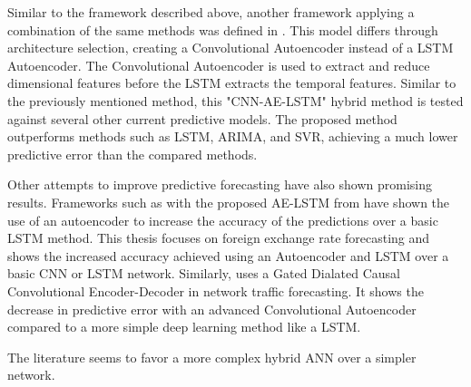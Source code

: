 Similar to the framework described above, another framework applying a combination of the same methods was defined in \cite{Zhao2019}.
This model differs through architecture selection, creating a Convolutional Autoencoder instead of a LSTM Autoencoder.
The Convolutional Autoencoder is used to extract and reduce dimensional features before the LSTM extracts the temporal features.
Similar to the previously mentioned method, this "CNN-AE-LSTM" hybrid method is tested against several other current predictive models.
The proposed method outperforms methods such as LSTM, ARIMA, and SVR, achieving a much lower predictive error than the compared methods.


Other attempts to improve predictive forecasting have also shown promising results.
Frameworks such as with the proposed AE-LSTM from \cite{VanHoa2021} have shown the use of an autoencoder to increase the accuracy of the predictions over a basic LSTM method.
This thesis focuses on foreign exchange rate forecasting and shows the increased accuracy achieved using an Autoencoder and LSTM over a basic CNN or LSTM network.
Similarly, \cite{Zhang2020} uses a Gated Dialated Causal Convolutional Encoder-Decoder in network traffic forecasting.
It shows the decrease in predictive error with an advanced Convolutional Autoencoder compared to a more simple deep learning method like a LSTM.

The literature seems to favor a more complex hybrid ANN over a simpler network.




\iffalse
  The proposed problem-space has data with high fluctuations and noise.
  In order to increase the predictive abilities of a model, a method well suited for working with data with high noise should be selected.
  A CNN-AE model should be able to solve this problem.
  The CNN is able to extract the spatial features of the data while the AE can filter out the noise and fluctuations in the data.
  By then adding a LSTM network at the end, the model should be able to extract the temoral featrues from the data.
  This hybrid framework should therefore be well suited for the task at hand.
\fi
